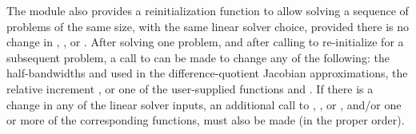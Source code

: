 The {\cvbbdpre} module also provides a reinitialization function to allow
solving a sequence of problems of the same size, with the same linear solver
choice, provided there is no change in , , or .
After solving one problem, and after calling  to
re-initialize {\cvodes} for a subsequent problem, a call to 
can be made to change any of the following: the half-bandwidths  and
 used in the difference-quotient Jacobian approximations, the relative
increment , or one of the user-supplied functions  and .
If there is a change in any of the linear solver inputs, an additional call
to , , or , and/or one or more of
the corresponding  functions, must also be made (in the proper order).

